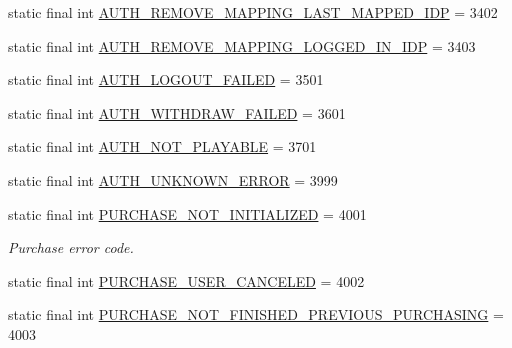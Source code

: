 \begin{DoxyCompactItemize}
\item 
static final int \hyperlink{classcom_1_1toast_1_1android_1_1gamebase_1_1base_1_1_gamebase_error_a20e46fe27702edff6e2bc56cb59ca4a1}{A\+U\+T\+H\+\_\+\+R\+E\+M\+O\+V\+E\+\_\+\+M\+A\+P\+P\+I\+N\+G\+\_\+\+L\+A\+S\+T\+\_\+\+M\+A\+P\+P\+E\+D\+\_\+\+I\+DP} = 3402
\item 
static final int \hyperlink{classcom_1_1toast_1_1android_1_1gamebase_1_1base_1_1_gamebase_error_adf44b4db7395f2d9cff124f885903f60}{A\+U\+T\+H\+\_\+\+R\+E\+M\+O\+V\+E\+\_\+\+M\+A\+P\+P\+I\+N\+G\+\_\+\+L\+O\+G\+G\+E\+D\+\_\+\+I\+N\+\_\+\+I\+DP} = 3403
\item 
static final int \hyperlink{classcom_1_1toast_1_1android_1_1gamebase_1_1base_1_1_gamebase_error_a6824bf2046e155715a78a7658bd28c3b}{A\+U\+T\+H\+\_\+\+L\+O\+G\+O\+U\+T\+\_\+\+F\+A\+I\+L\+ED} = 3501
\item 
static final int \hyperlink{classcom_1_1toast_1_1android_1_1gamebase_1_1base_1_1_gamebase_error_a480a18982a957f4f9a8d00f0500a08ff}{A\+U\+T\+H\+\_\+\+W\+I\+T\+H\+D\+R\+A\+W\+\_\+\+F\+A\+I\+L\+ED} = 3601
\item 
static final int \hyperlink{classcom_1_1toast_1_1android_1_1gamebase_1_1base_1_1_gamebase_error_a2295d6ef3c13d3aa1eba8c6cb7b70a76}{A\+U\+T\+H\+\_\+\+N\+O\+T\+\_\+\+P\+L\+A\+Y\+A\+B\+LE} = 3701
\item 
static final int \hyperlink{classcom_1_1toast_1_1android_1_1gamebase_1_1base_1_1_gamebase_error_a3c25651751bd65f6b97b00b4a3bfa59c}{A\+U\+T\+H\+\_\+\+U\+N\+K\+N\+O\+W\+N\+\_\+\+E\+R\+R\+OR} = 3999
\item 
static final int \hyperlink{classcom_1_1toast_1_1android_1_1gamebase_1_1base_1_1_gamebase_error_a6402187d8ebc1adc1ed73f178dbb5e9f}{P\+U\+R\+C\+H\+A\+S\+E\+\_\+\+N\+O\+T\+\_\+\+I\+N\+I\+T\+I\+A\+L\+I\+Z\+ED} = 4001
\begin{DoxyCompactList}\small\item\em Purchase error code. \end{DoxyCompactList}\item 
static final int \hyperlink{classcom_1_1toast_1_1android_1_1gamebase_1_1base_1_1_gamebase_error_a5bff106b35e4ec08de731f4c04861a1f}{P\+U\+R\+C\+H\+A\+S\+E\+\_\+\+U\+S\+E\+R\+\_\+\+C\+A\+N\+C\+E\+L\+ED} = 4002
\item 
static final int \hyperlink{classcom_1_1toast_1_1android_1_1gamebase_1_1base_1_1_gamebase_error_aa4215a5b5289aa38cdf200c9a54f098d}{P\+U\+R\+C\+H\+A\+S\+E\+\_\+\+N\+O\+T\+\_\+\+F\+I\+N\+I\+S\+H\+E\+D\+\_\+\+P\+R\+E\+V\+I\+O\+U\+S\+\_\+\+P\+U\+R\+C\+H\+A\+S\+I\+NG} = 4003

\end{DoxyCompactItemize}
